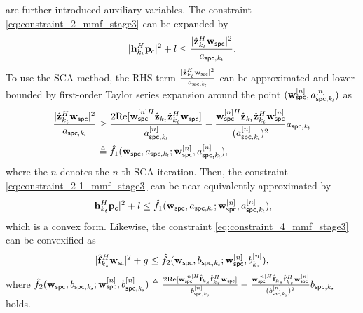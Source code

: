 \documentclass[draftclsnofoot, onecolumn, comsoc, 12pt]{IEEEtran}
\begin{document}
are further introduced auxiliary variables.
The constraint \eqref{eq:constraint_2_mmf_stage3} can be expanded by 
\begin{align}
\label{eq:constraint_2-1_mmf_stage3}
|{\mathbf{h}}_{k_{t}}^{H} \mathbf{p}_{\sf{c}}|^{2} + l \leq  \frac{|\hat{\mathbf{z}}_{k_{t}}^{H} \mathbf{w}_{\sf{spc}}|^{2}}{a_{\sf{spc},\it{k_{t}}}}.
\end{align}
{To use the SCA method, the RHS term $ \frac{|\hat{\mathbf{z}}_{k_{t}}^{H} \mathbf{w}_{\sf{spc}}|^{2}}{a_{\sf{spc},\it{k_{t}}}}$ can be approximated and lower-bounded by first-order Taylor series expansion around the point $(\mathbf{w}_{\sf{spc}}^{[n]},a_{\sf{spc},\it{k_{t}}}^{[n]})$ as}
\begin{align}
    \frac{|\hat{\mathbf{z}}_{k_{t}}^{H} \mathbf{w}_{\sf{spc}}|^{2}}{a_{\sf{spc},\it{k_{t}}}} &\geq
\frac{2\mathrm{Re}[\mathbf{w}_{\sf{spc}}^{[n]H} \hat{\mathbf{z}}_{k_{t}} \hat{\mathbf{z}}_{k_{t}}^{H} \mathbf{w}_{\sf{spc}}]}{a_{\sf{spc},\it{k_{t}}}^{[n]}} - \frac{\mathbf{w}_{\sf{spc}}^{[n]H} \hat{\mathbf{z}}_{k_{t}} \hat{\mathbf{z}}_{k_{t}}^{H} \mathbf{w}_{\sf{spc}}^{[n]}}{(a_{\sf{spc},\it{k_{t}}}^{[n]})^{2}}a_{\sf{spc},\it{k_{t}}} \nonumber\\  
&\triangleq \hat{f_{1}}(\mathbf{w}_{\sf{spc}},a_{\sf{spc},\it{k_{t}}};\mathbf{w}_{\sf{spc}}^{\mathit{[n]}},a_{\sf{spc},\it{k_{t}}}^{\mathit{[n]}}),
\end{align}
{where the $n$ denotes the $n$-th SCA iteration.} 
Then, the constraint \mbox{\eqref{eq:constraint_2-1_mmf_stage3}} can be near equivalently approximated by 
\begin{align}
\label{eq:constraint_2-2_mmf_stage3}
|{\mathbf{h}}_{k_{t}}^{H} \mathbf{p}_{\sf{c}}|^{2} + l \leq  \hat{f_{1}}(\mathbf{w}_{\sf{spc}},a_{\sf{spc},\it{k_{t}}};\mathbf{w}_{\sf{spc}}^{\mathit{[n]}},a_{\sf{spc},\it{k_{t}}}^{\mathit{[n]}}),
\end{align}
which is a convex form. 
Likewise, the constraint \mbox{\eqref{eq:constraint_4_mmf_stage3}} can be convexified as
\begin{align}
\label{eq:constraint_4-2_mmf_stage3}
|\hat{\mathbf{f}}_{k_{s}}^{H} \mathbf{w}_{\sf{sc}}|^{2} + g \leq \hat{f_{2}}(\mathbf{w}_{\sf{spc}},b_{\sf{spc},\it{k_{s}}};\mathbf{w}_{\sf{spc}}^{\mathit{[n]}},b_{k_{s}}^{\mathit{[n]}}),
\end{align}
where $\hat{f_{2}}(\mathbf{w}_{\sf{spc}},b_{\sf{spc},\it{k_{s}}};\mathbf{w}_{\sf{spc}}^{\mathit{[n]}},b_{\sf{spc},\it{k_{s}}}^{\mathit{[n]}}) \triangleq \frac{2\mathrm{Re}[\mathbf{w}_{\sf{spc}}^{[n]H} {\hat{\mathbf{f}}}_{k_{s}} {\hat{\mathbf{f}}}_{k_{s}}^{H} \mathbf{w}_{\sf{spc}}]}{b_{\sf{spc},\it{k_{s}}}^{[n]}} - \frac{\mathbf{w}_{\sf{spc}}^{[n]H} {\hat{\mathbf{f}}}_{k_{s}} {\hat{\mathbf{f}}}_{k_{s}}^{H} \mathbf{w}_{\sf{spc}}^{[n]}}{(b_{\sf{spc},\it{k_{s}}}^{[n]})^{2}}b_{\sf{spc},\it{k_{s}}}$ holds. 
\end{document}
